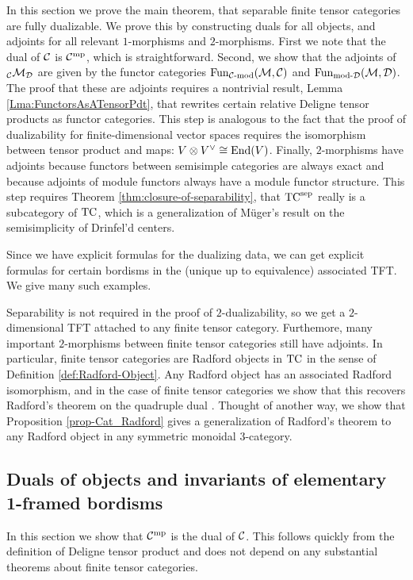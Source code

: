 \documentclass{amsart}
\begin{document}
In this section we prove the main theorem, that separable finite tensor categories are fully dualizable.  We prove this by constructing duals for all objects, and adjoints for all relevant $1$-morphisms and $2$-morphisms.  First we note that the dual of $\mathcal C$ is $\mathcal C^{\mathrm{mp}}$, which is straightforward.  Second, we show that the adjoints of ${}_\mathcal C \mathcal M_\mathcal D$ are given by the functor categories $\operatorname{Fun}_{{\mathcal C\text{-mod}}}(\mathcal M, \mathcal C)$ and $\operatorname{Fun}_{\text{mod-}\mathcal D}(\mathcal M, \mathcal D)$.  The proof that these are adjoints requires a nontrivial result, Lemma \ref{Lma:FunctorsAsATensorPdt}, that rewrites certain relative Deligne tensor products as functor categories.  This step is analogous to the fact that the proof of dualizability for finite-dimensional vector spaces requires the isomorphism between tensor product and maps: $V \otimes V^\vee \cong \operatorname{End}(V)$.  Finally, $2$-morphisms have adjoints because functors between semisimple categories are always exact and because adjoints of module functors always have a module functor structure.  This step requires Theorem \ref{thm:closure-of-separability}, that ${\mathrm{TC}^{\text{sep}}}$ really is a subcategory of $\mathrm{TC}$, which is a generalization of M\"uger's result on the semisimplicity of Drinfel'd centers.

Since we have explicit formulas for the dualizing data, we can get explicit formulas for certain bordisms in the (unique up to equivalence) associated TFT.  We give many such examples.

Separability is not required in the proof of $2$-dualizability, so we get a $2$-dimensional TFT attached to any finite tensor category.  Furthemore, many important $2$-morphisms between finite tensor categories still have adjoints.  In particular, finite tensor categories are Radford objects in $\mathrm{TC}$ in the sense of Definition \ref{def:Radford-Object}.  Any Radford object has an associated Radford isomorphism, and in the case of finite tensor categories we show that this recovers Radford's theorem on the quadruple dual \cite{MR0407069, MR2097289}.  Thought of another way, we show that Proposition \ref{prop-Cat_Radford} gives a generalization of Radford's theorem to any Radford object in any symmetric monoidal $3$-category.

\subsection{Duals of objects and invariants of elementary 1-framed bordisms} \label{sec:df-objects}

In this section we show that $\mathcal C^{\mathrm{mp}}$ is the dual of $\mathcal C$.  This follows quickly from the definition of Deligne tensor product and does not depend on any substantial theorems about finite tensor categories.
\end{document}
